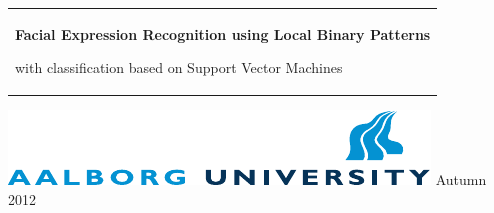 %
%
%
%
%
\begin{titlepage}
  \addtolength{\hoffset}{0.5\evensidemargin-0.5\oddsidemargin} %
  \noindent%
  \begin{tabular}{@{}p{\textwidth}@{}}
    \vspace{0.2cm}
    \begin{center}
    \Huge{\textbf{
      Facial Expression Recognition using Local Binary Patterns%
    }}
    \end{center}
    \begin{center}
      \Large{
        with classification based on Support Vector Machines%
      }
    \end{center}
    \vspace{0.2cm}\\
  \end{tabular}
  \vspace{4 cm}
  \vfill
  \noindent \includegraphics{figures/aau_logo_en} \hfill {\large Autumn 2012} \\
  \\
	
\end{titlepage}
\clearpage
